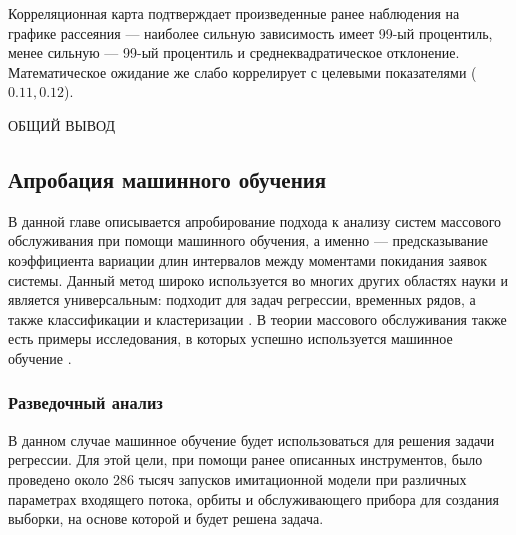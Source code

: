 Корреляционная карта подтверждает произведенные ранее наблюдения на графике рассеяния --- наиболее сильную зависимость имеет 99-ый процентиль, менее сильную --- 99-ый процентиль и среднеквадратическое отклонение. Математическое ожидание же слабо коррелирует с целевыми показателями ($0.11, 0.12$).

ОБЩИЙ ВЫВОД

\subsection{Апробация машинного обучения}
В данной главе описывается апробирование подхода к анализу систем массового обслуживания при помощи машинного обучения, а именно --- предсказывание коэффициента вариации длин интервалов между моментами покидания заявок системы. Данный метод широко используется во многих других областях науки и является универсальным: подходит для задач регрессии, временных рядов, а также классификации и кластеризации \cite{libbrecht2015machine,shinde2018review,soofi2017classification}. В теории массового обслуживания также есть примеры исследования, в которых успешно используется машинное обучение \cite{ojeda2021learning,xue2016scheduling,balla2018reliability}.

\subsubsection{Разведочный анализ}
В данном случае машинное обучение будет использоваться для решения задачи регрессии. Для этой цели, при помощи ранее описанных инструментов, было проведено около 286 тысяч запусков имитационной модели при различных параметрах входящего потока, орбиты и обслуживающего прибора для создания выборки, на основе которой и будет решена задача.

